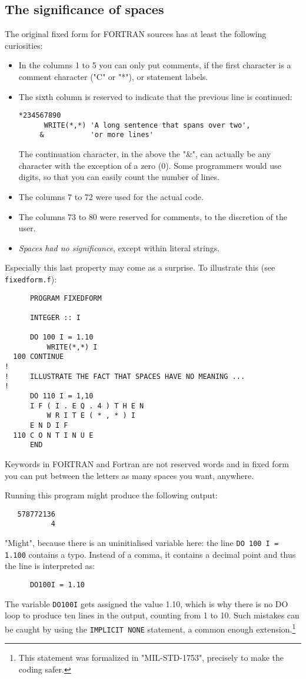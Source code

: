 \subsection{The significance of spaces}
The original fixed form for FORTRAN sources has at least the following curiosities:
\begin{itemize}
\item
In the columns 1 to 5 you can only put comments, if the first character is a comment character ("C" or "*"),
or statement labels.
\item
The sixth column is reserved to indicate that the previous line is continued:
\begin{verbatim}
*234567890
      WRITE(*,*) 'A long sentence that spans over two',
     &           'or more lines'
\end{verbatim}
The continuation character, in the above the "\&", can actually be any character with the exception of
a zero (0). Some programmers would use digits, so that you can easily count the number of lines.
\item
The columns 7 to 72 were used for the actual code.
\item
The columns 73 to 80 were reserved for comments, to the discretion of the user.
\item
\emph{Spaces had no significance}, except within literal strings.
\end{itemize}

Especially this last property may come as a surprise. To illustrate this (see \verb+fixedform.f+):
\begin{verbatim}
      PROGRAM FIXEDFORM

      INTEGER :: I

      DO 100 I = 1.10
          WRITE(*,*) I
  100 CONTINUE
!
!     ILLUSTRATE THE FACT THAT SPACES HAVE NO MEANING ...
!
      DO 110 I = 1,10
      I F ( I . E Q . 4 ) T H E N
          W R I T E ( * , * ) I
      E N D I F
  110 C O N T I N U E
      END
\end{verbatim}
Keywords in FORTRAN and Fortran are not reserved words and in fixed form you can
put between the letters as many spaces you want, anywhere.

Running this program might produce the following output:
\begin{verbatim}
   578772136
           4
\end{verbatim}
"Might", because there is an uninitialised variable here: the line \verb+DO 100 I = 1.100+
contains a typo. Instead of a comma, it contains a decimal point and thus the line is
interpreted as:
\begin{verbatim}
      DO100I = 1.10
\end{verbatim}
The variable \verb+DO100I+ gets assigned the value 1.10, which is why there is no DO loop
to produce ten lines in the output, counting from 1 to 10. Such mistakes can be caught
by using the \verb+IMPLICIT NONE+ statement, a common enough extension.\cite{Lionel}\footnote{This statement
was formalized in "MIL-STD-1753", precisely to make the coding safer.}

